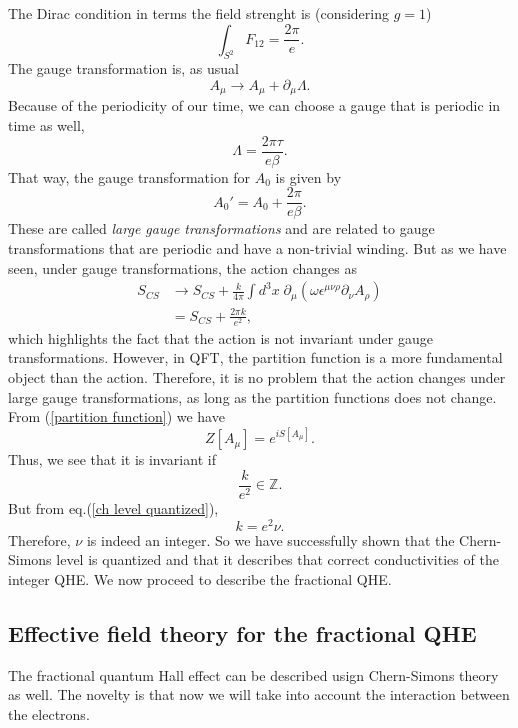 \documentclass{article}
\begin{document}
The Dirac condition in terms the field strenght is (considering $g=1$)
\begin{equation}
	\int_{S^2}F_{12}=\frac{2\pi}{e}.
\end{equation}
The gauge transformation is, as usual 
\begin{equation*}
	A_{\mu}\to A_{\mu}+\partial_{\mu}\Lambda. 
\end{equation*}
Because of the periodicity of our time, we can choose a gauge that is periodic in time as well, 
\begin{equation}
	\Lambda=\frac{2\pi\tau}{e\beta}.
\end{equation}
That way, the gauge transformation for $A_0$ is given by 
\begin{equation}
	A_0'=A_0+\frac{2\pi}{e\beta}.
\end{equation}
These are called \textit{large gauge transformations} and are related to gauge transformations that are periodic and have a non-trivial winding. But as we have seen, under gauge transformations, the action changes as 
\begin{equation}
	\begin{split}
		S_{CS}&\to S_{CS}+\frac{k}{4\pi}\int d^3x\; \partial_\mu(\omega\epsilon^{\mu\nu\rho}\partial_\nu A_\rho)\\ &= S_{CS}+\frac{2\pi k}{e^2},
	\end{split}
\end{equation}
which highlights the fact that the action is not invariant under gauge transformations.  However, in QFT, the partition function is a more fundamental object than the action. Therefore, it is no problem that the action changes under large gauge transformations, as long as the partition functions does not change. From (\ref{partition function}) we have
\begin{equation}
	Z[A_\mu]=e^{iS[A_\mu]}.
\end{equation}
Thus, we see that it is invariant if
\begin{equation}
	\frac{k}{e^2}\in\mathbb{Z}.
\end{equation}
But from eq.(\ref{ch level quantized}),
\begin{equation*}
	k=e^2\nu.
\end{equation*}
Therefore, $\nu$ is indeed an integer. So we have successfully shown that the Chern-Simons level is quantized and that it describes that correct conductivities of the integer QHE. We now proceed to describe the fractional QHE.  
\subsection{Effective field theory for the fractional QHE}
The fractional quantum Hall effect can be described usign Chern-Simons theory as well. The novelty is that now we will take into account the interaction between the electrons. 
\end{document}
